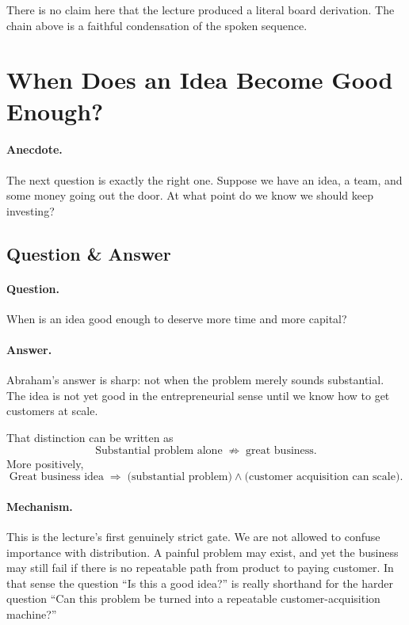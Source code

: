 \begin{remark}
There is no claim here that the lecture produced a literal board derivation. The chain above is a faithful condensation of the spoken sequence.
\end{remark}

\section{When Does an Idea Become Good Enough?}

\paragraph{Anecdote.} The next question is exactly the right one. Suppose we have an idea, a team, and some money going out the door. At what point do we know we should keep investing?

\subsection{Question \& Answer}

\paragraph{Question.} When is an idea good enough to deserve more time and more capital?

\paragraph{Answer.} Abraham's answer is sharp: not when the problem merely sounds substantial. The idea is not yet good in the entrepreneurial sense until we know how to get customers at scale.

That distinction can be written as
\begin{equation}
\text{Substantial problem alone}
\;\not\Rightarrow\;
\text{great business}.
\end{equation}
More positively,
\begin{equation}
\text{Great business idea}
\;\Rightarrow\;
\bigl(\text{substantial problem}\bigr)
\land
\bigl(\text{customer acquisition can scale}\bigr).
\end{equation}

\paragraph{Mechanism.} This is the lecture's first genuinely strict gate. We are not allowed to confuse importance with distribution. A painful problem may exist, and yet the business may still fail if there is no repeatable path from product to paying customer. In that sense the question ``Is this a good idea?'' is really shorthand for the harder question ``Can this problem be turned into a repeatable customer-acquisition machine?''

